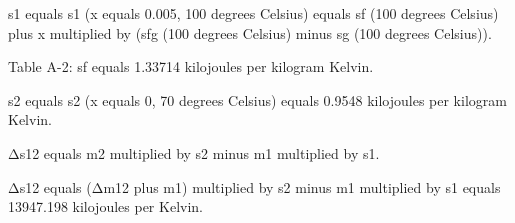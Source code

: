 s1 equals s1 (x equals 0.005, 100 degrees Celsius) equals sf (100 degrees Celsius) plus x multiplied by (sfg (100 degrees Celsius) minus sg (100 degrees Celsius)).  

Table A-2: sf equals 1.33714 kilojoules per kilogram Kelvin.  

s2 equals s2 (x equals 0, 70 degrees Celsius) equals 0.9548 kilojoules per kilogram Kelvin.  

Δs12 equals m2 multiplied by s2 minus m1 multiplied by s1.  

Δs12 equals (Δm12 plus m1) multiplied by s2 minus m1 multiplied by s1 equals 13947.198 kilojoules per Kelvin.